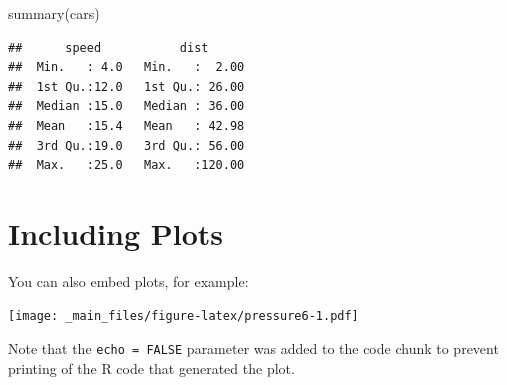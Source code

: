 \documentclass[
]{book}
\newenvironment{Shaded}{\begin{snugshade}}{\end{snugshade}}
\newcommand{\FunctionTok}[1]{\textcolor[rgb]{0.00,0.00,0.00}{#1}}
\newcommand{\NormalTok}[1]{#1}
\begin{document}
\begin{Shaded}
\begin{Highlighting}[]
\FunctionTok{summary}\NormalTok{(cars)}
\end{Highlighting}
\end{Shaded}

\begin{verbatim}
##      speed           dist       
##  Min.   : 4.0   Min.   :  2.00  
##  1st Qu.:12.0   1st Qu.: 26.00  
##  Median :15.0   Median : 36.00  
##  Mean   :15.4   Mean   : 42.98  
##  3rd Qu.:19.0   3rd Qu.: 56.00  
##  Max.   :25.0   Max.   :120.00
\end{verbatim}

\hypertarget{including-plots-3}{%
\section{Including Plots}\label{including-plots-3}}

You can also embed plots, for example:

\texttt{[image: \_main\_files/figure-latex/pressure6-1.pdf]}

Note that the \texttt{echo\ =\ FALSE} parameter was added to the code chunk to prevent printing of the R code that generated the plot.

  
\end{document}

